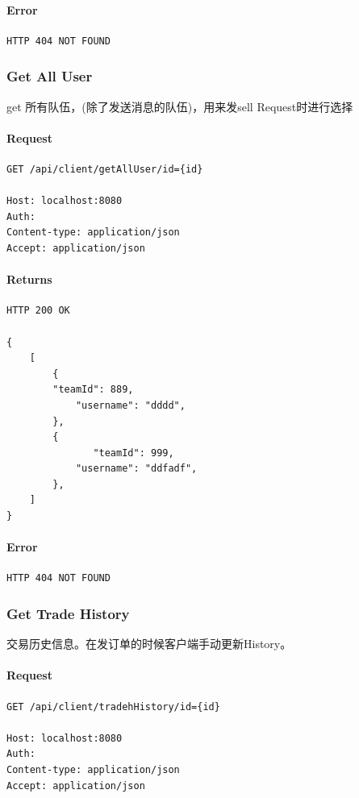 \documentclass{article}
\begin{document}
\paragraph*{Error}
\begin{lstlisting}
HTTP 404 NOT FOUND
\end{lstlisting}

\subsubsection{Get All User}
get 所有队伍，(除了发送消息的队伍)，用来发sell Request时进行选择
\paragraph*{Request}
\begin{lstlisting}
GET /api/client/getAllUser/id={id}

Host: localhost:8080
Auth:
Content-type: application/json
Accept: application/json

\end{lstlisting}
\paragraph*{Returns}
\begin{lstlisting}
HTTP 200 OK

{
    [
        {
        "teamId": 889,
            "username": "dddd",
        },
        {
               "teamId": 999,
            "username": "ddfadf",
        },
    ]
}
\end{lstlisting}
					\paragraph*{Error}
\begin{lstlisting}
HTTP 404 NOT FOUND
\end{lstlisting}

				\subsubsection{Get Trade History}
					交易历史信息。在发订单的时候客户端手动更新History。
					\paragraph*{Request}
\begin{lstlisting}
GET /api/client/tradehHistory/id={id}

Host: localhost:8080
Auth:
Content-type: application/json
Accept: application/json
\end{lstlisting}
\end{document}
